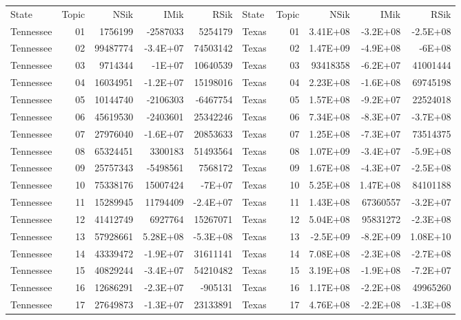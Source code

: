 \begin{table}[]
	\footnotesize
	\begin{tabular}{lrrrrlrrrr}
		State & Topic & NSik & IMik & RSik & State & Topic & NSik & IMik & RSik \\
		Tennessee &  01  & 1756199 & -2587033 & 5254179 & Texas &  01  & 3.41E+08 & -3.2E+08 & -2.5E+08 \\
		Tennessee &  02  & 99487774 & -3.4E+07 & 74503142 & Texas &  02  & 1.47E+09 & -4.9E+08 & -6E+08 \\
		Tennessee &  03  & 9714344 & -1E+07 & 10640539 & Texas &  03  & 93418358 & -6.2E+07 & 41001444 \\
		Tennessee &  04  & 16034951 & -1.2E+07 & 15198016 & Texas &  04  & 2.23E+08 & -1.6E+08 & 69745198 \\
		Tennessee &  05  & 10144740 & -2106303 & -6467754 & Texas &  05  & 1.57E+08 & -9.2E+07 & 22524018 \\
		Tennessee &  06  & 45619530 & -2403601 & 25342246 & Texas &  06  & 7.34E+08 & -8.3E+07 & -3.7E+08 \\
		Tennessee &  07  & 27976040 & -1.6E+07 & 20853633 & Texas &  07  & 1.25E+08 & -7.3E+07 & 73514375 \\
		Tennessee &  08  & 65324451 & 3300183 & 51493564 & Texas &  08  & 1.07E+09 & -3.4E+07 & -5.9E+08 \\
		Tennessee &  09  & 25757343 & -5498561 & 7568172 & Texas &  09  & 1.67E+08 & -4.3E+07 & -2.5E+08 \\
		Tennessee &  10 & 75338176 & 15007424 & -7E+07 & Texas &  10 & 5.25E+08 & 1.47E+08 & 84101188 \\
		Tennessee &  11 & 15289945 & 11794409 & -2.4E+07 & Texas &  11 & 1.43E+08 & 67360557 & -3.2E+07 \\
		Tennessee &  12 & 41412749 & 6927764 & 15267071 & Texas &  12 & 5.04E+08 & 95831272 & -2.3E+08 \\
		Tennessee &  13 & 57928661 & 5.28E+08 & -5.3E+08 & Texas &  13 & -2.5E+09 & -8.2E+09 & 1.08E+10 \\
		Tennessee &  14 & 43339472 & -1.9E+07 & 31611141 & Texas &  14 & 7.08E+08 & -2.3E+08 & -2.7E+08 \\
		Tennessee &  15 & 40829244 & -3.4E+07 & 54210482 & Texas &  15 & 3.19E+08 & -1.9E+08 & -7.2E+07 \\
		Tennessee &  16 & 12686291 & -2.3E+07 & -905131 & Texas &  16 & 1.17E+08 & -2.2E+08 & 49965260 \\
		Tennessee &  17 & 27649873 & -1.3E+07 & 23133891 & Texas &  17 & 4.76E+08 & -2.2E+08 & -1.3E+08 \\

\end{tabular}
\end{table}
